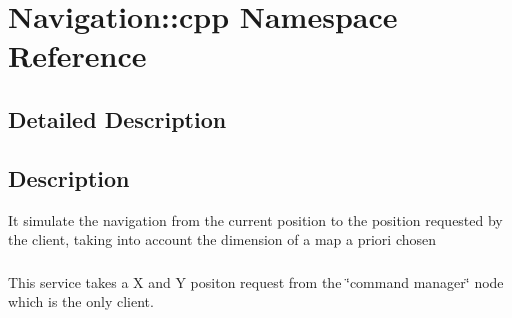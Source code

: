 \hypertarget{namespaceNavigation_1_1cpp}{}\section{Navigation\+:\+:cpp Namespace Reference}
\label{namespaceNavigation_1_1cpp}


\subsection{Detailed Description}
\hypertarget{namespaceNavigation_1_1cpp_Description}{}\subsection{Description}\label{namespaceNavigation_1_1cpp_Description}
It simulate the navigation from the current position to the position requested by the client, taking into account the dimension of a map a priori chosen \hypertarget{_}{}\subsubsection{}\label{_}
This service takes a X and Y positon request from the \char`\"{}command manager\char`\"{} node which is the only client. 